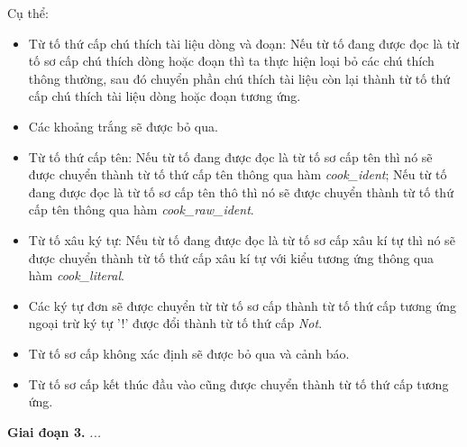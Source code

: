 Cụ thể:
\begin{itemize}
  \item Từ tố thứ cấp chú thích tài liệu dòng và đoạn: Nếu từ tố đang được đọc là từ tố sơ cấp chú thích dòng hoặc đoạn thì ta thực hiện loại bỏ các chú thích thông thường, sau đó chuyển phần chú thích tài liệu còn lại thành từ tố thứ cấp chú thích tài liệu dòng hoặc đoạn tương ứng.
  \item Các khoảng trắng sẽ được bỏ qua.
  \item Từ tố thứ cấp tên: Nếu từ tố đang được đọc là từ tố sơ cấp tên thì nó sẽ được chuyển thành từ tố thứ cấp tên thông qua hàm \textit{cook\_ident}; Nếu từ tố đang được đọc là từ tố sơ cấp tên thô thì nó sẽ được chuyển thành từ tố thứ cấp tên thông qua hàm \textit{cook\_raw\_ident}.
  \item Từ tố xâu ký tự: Nếu từ tố đang được đọc là từ tố sơ cấp xâu kí tự thì nó sẽ được chuyển thành từ tố thứ cấp xâu kí tự với kiểu tương ứng thông qua hàm \textit{cook\_literal}.
  \item Các ký tự đơn sẽ được chuyển từ từ tố sơ cấp thành từ tố thứ cấp tương ứng ngoại trừ ký tự '!' được đổi thành từ tố thứ cấp \textit{Not}.
  \item Từ tố sơ cấp không xác định sẽ được bỏ qua và cảnh báo.
  \item Từ tố sơ cấp kết thúc đầu vào cũng được chuyển thành từ tố thứ cấp tương ứng.
\end{itemize}

\textbf{Giai đoạn 3.} \textit{...}

                
